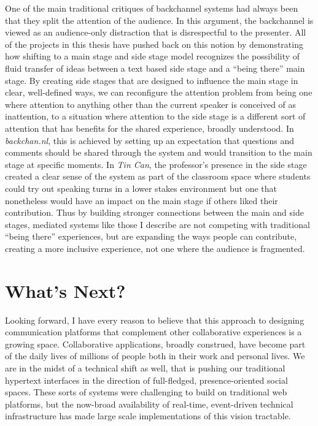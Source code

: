 One of the main traditional critiques of backchannel systems had always been that they split the attention of the audience. In this argument, the backchannel is viewed as an audience-only distraction that is disrespectful to the presenter. All of the projects in this thesis have pushed back on this notion by demonstrating how shifting to a main stage and side stage model recognizes the possibility of fluid transfer of ideas between a text based side stage and a ``being there'' main stage. By creating side stages that are designed to influence the main stage in clear, well-defined ways, we can reconfigure the attention problem from being one where attention to anything other than the current speaker is conceived of as inattention, to a situation where attention to the side stage is a different sort of attention that has benefits for the shared experience, broadly understood. In \emph{backchan.nl}, this is achieved by setting up an expectation that questions and comments should be shared through the system and would transition to the main stage at specific moments. In \emph{Tin Can}, the professor's presence in the side stage created a clear sense of the system as part of the classroom space where students could try out speaking turns in a lower stakes environment but one that nonetheless would have an impact on the main stage if others liked their contribution. Thus by building stronger connections between the main and side stages, mediated systems like those I describe are not competing with traditional ``being there'' experiences, but are expanding the ways people can contribute, creating a more inclusive experience, not one where the audience is fragmented.





\section{What's Next?}
Looking forward, I have every reason to believe that this approach to designing communication platforms that complement other collaborative experiences is a growing space. Collaborative applications, broadly construed, have become part of the daily lives of millions of people both in their work and personal lives. We are in the midst of a technical shift as well, that is pushing our traditional hypertext interfaces in the direction of full-fledged, presence-oriented social spaces. These sorts of systems were challenging to build on traditional web platforms, but the now-broad availability of real-time, event-driven technical infrastructure has made large scale implementations of this vision tractable.

